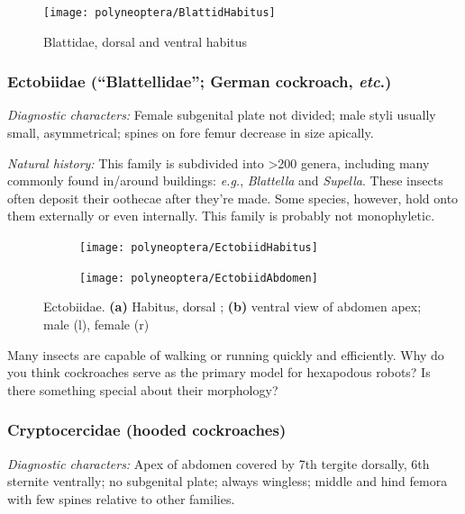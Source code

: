 \begin{figure}[ht!]
  \centering
    \texttt{[image: polyneoptera/BlattidHabitus]}
  \caption{Blattidae, dorsal and ventral habitus \citep[][Fig. 1]{bhl129194}}
  \label{fig:blattid1}
\end{figure}

\subsubsection{Ectobiidae (``Blattellidae''; German cockroach, \textit{etc}.)}
\noindent{}\textit{Diagnostic characters:} Female subgenital plate not divided; male styli usually small, asymmetrical; spines on fore femur decrease in size apically.\vspace{3mm}

\noindent{}\textit{Natural history:} This family is subdivided into \textgreater200 genera, including many commonly found in/around buildings: \textit{e.g.}, \textit{Blattella} and \textit{Supella}. These insects often deposit their oothecae after they're made. Some species, however, hold onto them externally or even internally. This family is probably not monophyletic.\vspace{3mm}

\begin{figure}[ht!]
    \centering
    \begin{subfigure}[ht!]{0.45\textwidth}
        \texttt{[image: polyneoptera/EctobiidHabitus]}
        \caption{}
        \label{fig:ectobiidhabitus}
    \end{subfigure}
    \qquad
    \begin{subfigure}[ht!]{0.45\textwidth}
        \texttt{[image: polyneoptera/EctobiidAbdomen]}
        \caption{}
        \label{fig:ectobiidgenit}
    \end{subfigure}
    \caption{Ectobiidae. \textbf{(a)} Habitus, dorsal \citep[][Plate III, Fig. 14A]{bhl26431}; \textbf{(b)} ventral view of abdomen apex; male (l), female (r) \citep[Plate II, Fig. 7E,D]{bhl26431}}\label{fig:ectobiidae}
\end{figure}

\begin{theo}
{}Many insects are capable of walking or running quickly and efficiently. Why do you think cockroaches serve as the primary model for hexapodous robots? Is there something special about their morphology?
\end{theo}

\subsubsection{Cryptocercidae (hooded cockroaches)}
\noindent{}\textit{Diagnostic characters:} Apex of abdomen covered by 7th tergite dorsally, 6th sternite ventrally; no subgenital plate; always wingless; middle and hind femora with few spines relative to other families.\vspace{3mm}


